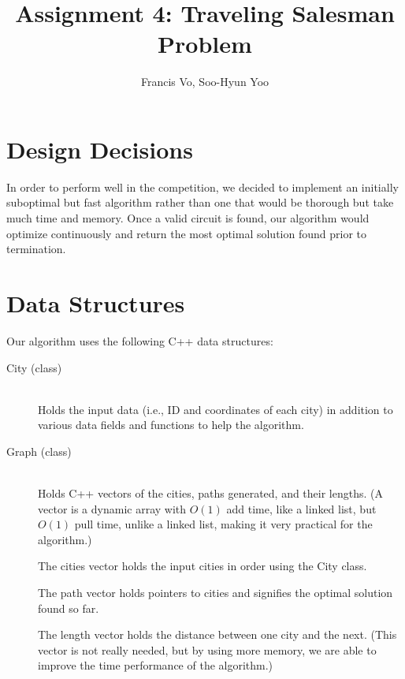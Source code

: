 \documentclass[letterpaper,12pt]{article}
\title{Assignment 4: Traveling Salesman Problem}
\author{Francis Vo, Soo-Hyun Yoo}
\begin{document}
\maketitle

	\section{Design Decisions}
		In order to perform well in the competition, we decided to implement
		an initially suboptimal but fast algorithm rather than one that would
		be thorough but take much time and memory. Once a valid circuit is
		found, our algorithm would optimize continuously and return the most
		optimal solution found prior to termination.


	\section{Data Structures}
		Our algorithm uses the following C++ data structures:
		\begin{description}
			\item[City (class)] \hfill \\
				Holds the input data (i.e., ID and coordinates of each city) in
				addition to various data fields and functions to help the
				algorithm.
			\item[Graph (class)] \hfill \\
				Holds C++ vectors of the cities, paths generated, and their
				lengths. (A vector is a dynamic array with $O(1)$ add time,
				like a linked list, but $O(1)$ pull time, unlike a linked list,
				making it very practical for the algorithm.)

				The cities vector holds the input cities in order using the
				City class.

				The path vector holds pointers to cities and signifies the
				optimal solution found so far.

				The length vector holds the distance between one city and the
				next. (This vector is not really needed, but by using more
				memory, we are able to improve the time performance of the
				algorithm.)
		\end{description}
\end{document}
